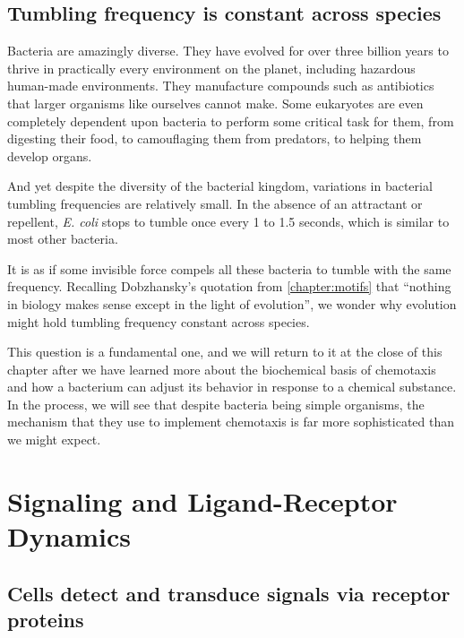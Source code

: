 \FloatBarrier
{}
\subsection{Tumbling frequency is constant across species}

Bacteria are amazingly diverse. They have evolved for over three billion years to thrive in practically every environment on the planet, including hazardous human-made environments. They manufacture compounds such as antibiotics that larger organisms like ourselves cannot make. Some eukaryotes are even completely dependent upon bacteria to perform some critical task for them, from digesting their food, to camouflaging them from predators, to helping them develop organs.

And yet despite the diversity of the bacterial kingdom, variations in bacterial tumbling frequencies are relatively small. In the absence of an attractant or repellent, \textit{E. coli} stops to tumble once every 1 to 1.5 seconds, which is similar to most other bacteria.

It is as if some invisible force compels all these bacteria to tumble with the same frequency. Recalling Dobzhansky's quotation from \autoref{chapter:motifs} that ``nothing in biology makes sense except in the light of evolution'', we wonder why evolution might hold tumbling frequency constant across species.

This question is a fundamental one, and we will return to it at the close of this chapter after we have learned more about the biochemical basis of chemotaxis and how a bacterium can adjust its behavior in response to a chemical substance. In the process, we will see that despite bacteria being simple organisms, the mechanism that they use to implement chemotaxis is far more sophisticated than we might expect.\\


\FloatBarrier
{}
\section{Signaling and Ligand-Receptor Dynamics}
\label{sec:signal}

\subsection{Cells detect and transduce signals via receptor proteins}

